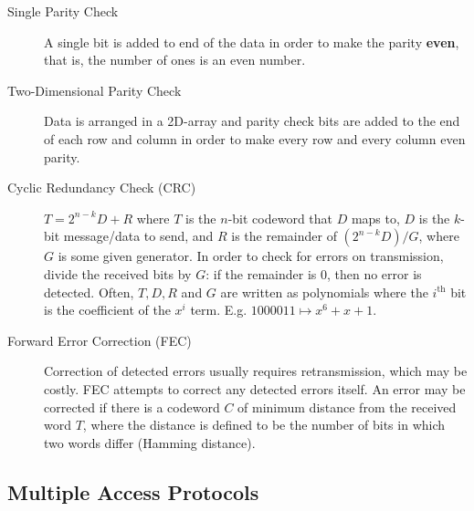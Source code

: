\documentclass{article}
\begin{document}
\begin{description}
    \item[Single Parity Check] A single bit is added to end of the data in order to make the parity
    \textbf{even}, that is, the number of ones is an even number.
    
    \item[Two-Dimensional Parity Check] Data is arranged in a 2D-array and parity check bits are added
    to the end of each row and column in order to make every row and every column even parity.
    
    \item[Cyclic Redundancy Check (CRC)] $T=2^{n-k}D+R$ where $T$ is the $n$-bit codeword that $D$
    maps to, $D$ is the $k$-bit message/data to send, and $R$ is the remainder of $(2^{n-k}D)/G$, 
    where $G$ is some given generator. In order to check for errors on transmission, divide the received bits 
    by $G$: if the remainder is $0$, then no error is detected. Often, $T,D,R$ and $G$ are written 
    as polynomials where the $i^\text{th}$ bit is the coefficient of the $x^i$ term.
    E.g. $1000011\mapsto x^6+x+1.$ 
    
    \item[Forward Error Correction (FEC)] Correction of detected errors usually requires retransmission,
    which may be costly. FEC attempts to correct any detected errors itself. An error may be corrected
    if there is a codeword $C$ of minimum distance from the received word $T$, where the distance is
    defined to be the number of bits in which two words differ (Hamming distance).
\end{description}

\subsection*{Multiple Access Protocols}
\end{document}
